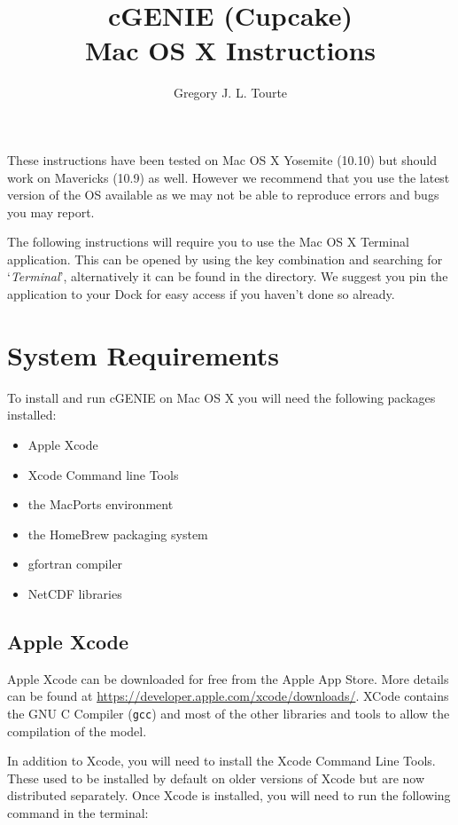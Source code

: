 \documentclass{scrartcl}
\title{cGENIE (Cupcake)\\
Mac OS X Instructions}
\author{Gregory J. L. Tourte}
\begin{document}
\maketitle

These instructions have been tested on Mac OS X Yosemite (10.10) but should
work on Mavericks (10.9) as well. However we recommend that you use the latest
version of the OS available as we may not be able to reproduce errors and bugs
you may report.

The following instructions will require you to use the Mac OS X Terminal
application. This can be opened by using the \keys{\cmd+\SPACE} key combination
and searching for `\textit{Terminal}', alternatively it can be found in the
 directory. We suggest you pin
the application to your Dock for easy access if you haven't done so already.

\section{System Requirements}

To install and run cGENIE on Mac OS X you will need the following packages
installed:

\begin{itemize} \item Apple Xcode \item Xcode Command line Tools \item the
		MacPorts environment \item the HomeBrew packaging system \item gfortran
		compiler \item NetCDF libraries \end{itemize}

\subsection{Apple Xcode}

Apple Xcode can be downloaded for free from the Apple App Store. More details
can be found at \url{https://developer.apple.com/xcode/downloads/}. XCode
contains the GNU C Compiler (\texttt{gcc}) and most of the other libraries and
tools to allow the compilation of the model.

In addition to Xcode, you will need to install the Xcode Command Line Tools.
These used to be installed by default on older versions of Xcode but are now
distributed separately. Once Xcode is installed, you will need to run the
following command in the terminal:
\end{document}
